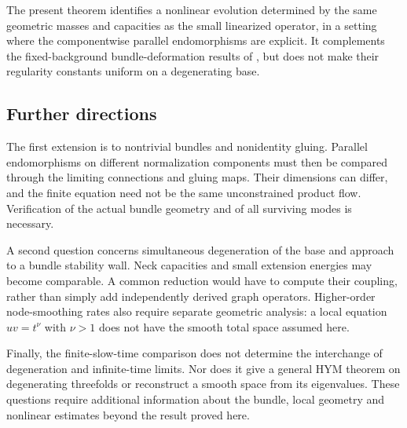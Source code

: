 The present theorem identifies a nonlinear evolution determined by the
same geometric masses and capacities as the small linearized operator,
in a setting where the componentwise parallel endomorphisms are explicit.
It complements the
fixed-background bundle-deformation results of
\cite{wuebben-local,wuebben-phase}, but does not make their
regularity constants uniform on a degenerating base.

\subsection{Further directions}
The first extension is to nontrivial bundles and nonidentity gluing.
Parallel endomorphisms on different normalization components must
then be compared through the limiting connections and gluing maps.
Their dimensions can differ, and the finite equation need not be
the same unconstrained product flow. Verification of the actual
bundle geometry and of all surviving modes is necessary.

A second question concerns simultaneous degeneration of the base
and approach to a bundle stability wall. Neck capacities and small
extension energies may become comparable. A common reduction would
have to compute their coupling, rather than simply add independently
derived graph operators. Higher-order node-smoothing rates also
require separate geometric analysis: a local equation $uv=t^\nu$
with $\nu>1$ does not have the smooth total space assumed here.

Finally, the finite-slow-time comparison does not determine the
interchange of degeneration and infinite-time limits. Nor does it
give a general HYM theorem on degenerating threefolds or reconstruct
a smooth space from its eigenvalues. These questions require
additional information about the bundle, local geometry and
nonlinear estimates beyond the result proved here.
